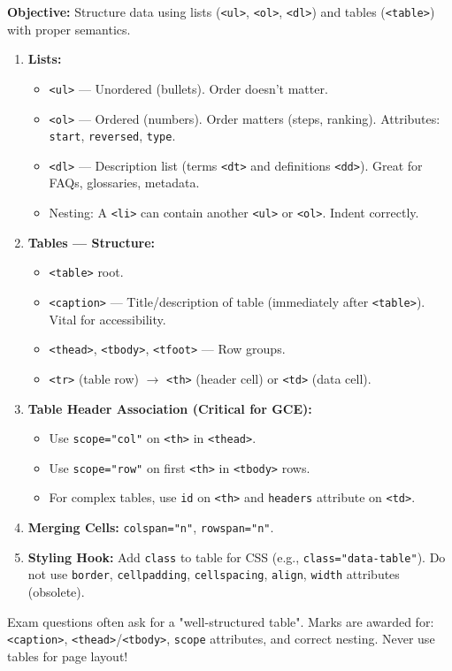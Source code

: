 \documentclass[11pt]{article}
\begin{document}
\begin{methode}
\textbf{Objective:} Structure data using lists (\texttt{<ul>}, \texttt{<ol>}, \texttt{<dl>}) and tables (\texttt{<table>}) with proper semantics.
\begin{enumerate}
    \item \textbf{Lists:}
        \begin{itemize}
            \item \texttt{<ul>} — Unordered (bullets). Order doesn't matter.
            \item \texttt{<ol>} — Ordered (numbers). Order matters (steps, ranking). Attributes: \texttt{start}, \texttt{reversed}, \texttt{type}.
            \item \texttt{<dl>} — Description list (terms \texttt{<dt>} and definitions \texttt{<dd>}). Great for FAQs, glossaries, metadata.
            \item Nesting: A \texttt{<li>} can contain another \texttt{<ul>} or \texttt{<ol>}. Indent correctly.
        \end{itemize}
    \item \textbf{Tables — Structure:}
        \begin{itemize}
            \item \texttt{<table>} root.
            \item \texttt{<caption>} — Title/description of table (immediately after \texttt{<table>}). Vital for accessibility.
            \item \texttt{<thead>}, \texttt{<tbody>}, \texttt{<tfoot>} — Row groups.
            \item \texttt{<tr>} (table row) $\to$ \texttt{<th>} (header cell) or \texttt{<td>} (data cell).
        \end{itemize}
    \item \textbf{Table Header Association (Critical for GCE):}
        \begin{itemize}
            \item Use \texttt{scope="col"} on \texttt{<th>} in \texttt{<thead>}.
            \item Use \texttt{scope="row"} on first \texttt{<th>} in \texttt{<tbody>} rows.
            \item For complex tables, use \texttt{id} on \texttt{<th>} and \texttt{headers} attribute on \texttt{<td>}.
        \end{itemize}
    \item \textbf{Merging Cells:} \texttt{colspan="n"}, \texttt{rowspan="n"}.
    \item \textbf{Styling Hook:} Add \texttt{class} to table for CSS (e.g., \texttt{class="data-table"}). Do not use \texttt{border}, \texttt{cellpadding}, \texttt{cellspacing}, \texttt{align}, \texttt{width} attributes (obsolete).
\end{enumerate}
\begin{aretenir}
Exam questions often ask for a "well-structured table". Marks are awarded for: \texttt{<caption>}, \texttt{<thead>}/\texttt{<tbody>}, \texttt{scope} attributes, and correct nesting. Never use tables for page layout!
\end{aretenir}
\end{methode}
\end{document}
